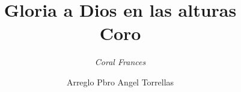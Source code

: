 \documentclass[letterpaper]{report}
\title{ \textbf{ \Huge Gloria a Dios en las alturas  } \\ { \Huge Coro } }
\author{ \textit{ \huge Coral Frances } }
\date{ \LARGE Arreglo Pbro Angel Torrellas }
\begin{document}
    
    \maketitle
     
    \begin{landscape}
        {%
\parindent 0pt
\noindent
\ifx\preLilyPondExample \undefined
\else
  \expandafter\preLilyPondExample
\fi
\def\lilypondbook{}%

\ifx\postLilyPondExample \undefined
\else
  \expandafter\postLilyPondExample
\fi
}    
    \end{landscape}
    
    {%
\parindent 0pt
\noindent
\ifx\preLilyPondExample \undefined
\else
  \expandafter\preLilyPondExample
\fi
\def\lilypondbook{}%

\ifx\postLilyPondExample \undefined
\else
  \expandafter\postLilyPondExample
\fi
}
    \clearpage
    
    {%
\parindent 0pt
\noindent
\ifx\preLilyPondExample \undefined
\else
  \expandafter\preLilyPondExample
\fi
\def\lilypondbook{}%

\ifx\postLilyPondExample \undefined
\else
  \expandafter\postLilyPondExample
\fi
}
    \clearpage
    
    {%
\parindent 0pt
\noindent
\ifx\preLilyPondExample \undefined
\else
  \expandafter\preLilyPondExample
\fi
\def\lilypondbook{}%

\ifx\postLilyPondExample \undefined
\else
  \expandafter\postLilyPondExample
\fi
}
    \clearpage
    
    {%
\parindent 0pt
\noindent
\ifx\preLilyPondExample \undefined
\else
  \expandafter\preLilyPondExample
\fi
\def\lilypondbook{}%

\ifx\postLilyPondExample \undefined
\else
  \expandafter\postLilyPondExample
\fi
}
    \clearpage
    
\end{document}
